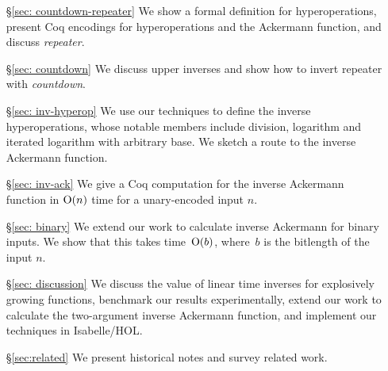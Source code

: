 \begin{itemize}
    \item[\S\ref{sec: countdown-repeater}] We show a formal definition for hyperoperations, present Coq encodings for hyperoperations and the Ackermann function, and discuss \emph{repeater}.
    \item[\S\ref{sec: countdown}] We discuss upper inverses and show how to invert repeater with \emph{countdown}.
    \item[\S\ref{sec: inv-hyperop}] We use our techniques to define the inverse hyperoperations, whose notable members include division, logarithm and iterated logarithm with arbitrary base. We sketch a route to the inverse Ackermann function.
    \item[\S\ref{sec: inv-ack}] We give a Coq computation for the inverse Ackermann function in $\text{O}(n)$ time for a unary-encoded input $n$.
    \item[\S\ref{sec: binary}] We extend our work to calculate inverse Ackermann for binary inputs. We show that this takes time~$\text{O}(b)$, where~$b$ is the bitlength of the input $n$.
    \item[\S\ref{sec: discussion}] We discuss the value of linear time inverses for
    explosively growing functions, benchmark our results experimentally, extend our work to calculate the two-argument inverse Ackermann function, and 
    implement our techniques in Isabelle/HOL.
    \item[\S\ref{sec:related}] We present historical notes and survey related work.
\end{itemize}
